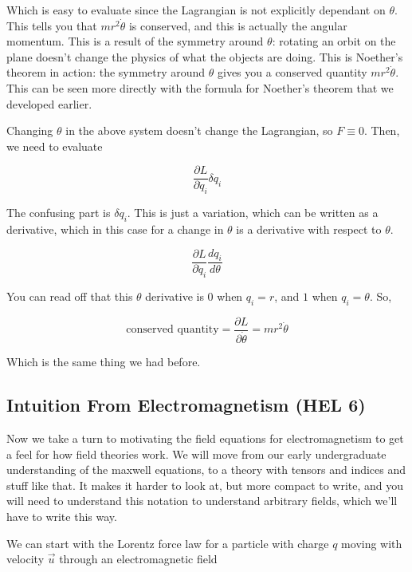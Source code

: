 \documentclass{article}
\begin{document}
Which is easy to evaluate since the Lagrangian is not explicitly dependant on $\theta$. This tells you that $mr^2\dot{\theta}$ is conserved, and this is actually the angular momentum. This is a result of the symmetry around $\theta$: rotating an orbit on the plane doesn't change the physics of what the objects are doing. This is Noether's theorem in action: the symmetry around $\theta$ gives you a conserved quantity $mr^2\dot{\theta}$. This can be seen more directly with the formula for Noether's theorem that we developed earlier. 

Changing $\theta$ in the above system doesn't change the Lagrangian, so $F \equiv 0$. Then, we need to evaluate

\begin{equation}
    \frac{\partial L}{\partial \dot{q}_i}\delta q_i
\end{equation}

The confusing part is $\delta q_i$. This is just a variation, which can be written as a derivative, which in this case for a change in $\theta$ is a derivative with respect to $\theta$.

\begin{equation}
    \frac{\partial L}{\partial \dot{q}_i} \frac{d q_i}{d\theta}
\end{equation}

You can read off that this $\theta$ derivative is $0$ when $q_i=r$, and $1$ when $q_i=\theta$. So,

\begin{equation}
    \text{conserved quantity} = \frac{\partial L}{\partial \dot{\theta}} = mr^2\dot{\theta}
\end{equation}

Which is the same thing we had before.

\subsection{Intuition From Electromagnetism (HEL 6)} \label{sec:EM}
Now we take a turn to motivating the field equations for electromagnetism to get a feel for how field theories work. We will move from our early undergraduate understanding of the maxwell equations, to a theory with tensors and indices and stuff like that. It makes it harder to look at, but more compact to write, and you will need to understand this notation to understand arbitrary fields, which we'll have to write this way.

We can start with the Lorentz force law for a particle with charge $q$ moving with velocity $\vec{u}$ through an electromagnetic field
\end{document}
